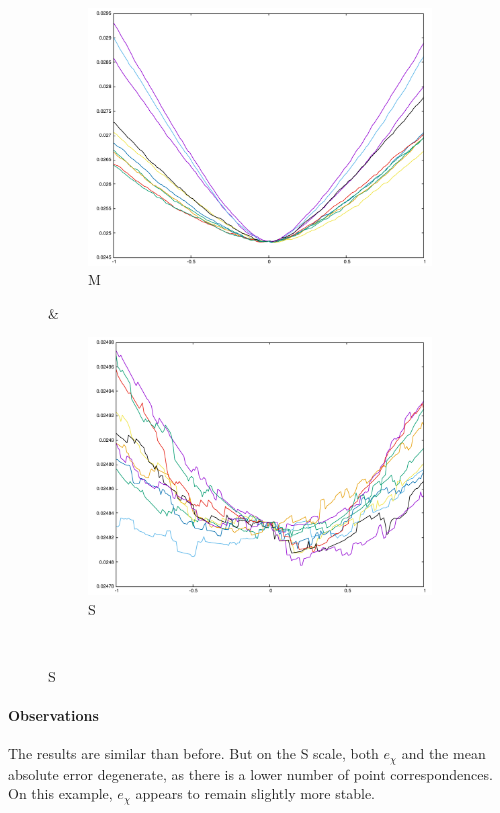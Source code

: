 \begin{figure}[H]
\begin{subfigure}{.33\textwidth}
	\includegraphics[width=\linewidth]{fig/ajherr/t2/M_mae.pdf}
	\caption{M}
\end{subfigure}&
\begin{subfigure}{.33\textwidth}
	\includegraphics[width=\linewidth]{fig/ajherr/t2/S_mae.pdf}
	\caption{S}
\end{subfigure}\\
\end{figure}

\paragraph{Observations} The results are similar than before. But on the S scale, both $e_{\chi}$ and the mean absolute error degenerate, as there is a lower number of point correspondences. On this example, $e_{\chi}$ appears to remain slightly more stable.


